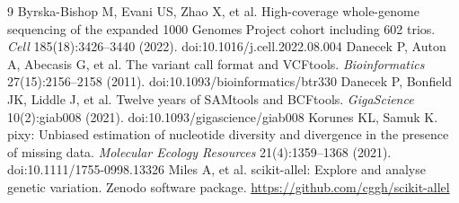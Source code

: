 \documentclass[11pt]{article}
\begin{document}
\begin{thebibliography}{9}
 Byrska-Bishop M, Evani US, Zhao X, et al.
  High-coverage whole-genome sequencing of the expanded 1000 Genomes Project
  cohort including 602 trios. \textit{Cell} 185(18):3426--3440 (2022).
  doi:10.1016/j.cell.2022.08.004
 Danecek P, Auton A, Abecasis G, et al.
  The variant call format and VCFtools. \textit{Bioinformatics}
  27(15):2156--2158 (2011). doi:10.1093/bioinformatics/btr330
 Danecek P, Bonfield JK, Liddle J, et al.
  Twelve years of SAMtools and BCFtools. \textit{GigaScience} 10(2):giab008
  (2021). doi:10.1093/gigascience/giab008
 Korunes KL, Samuk K. pixy: Unbiased estimation of nucleotide
  diversity and divergence in the presence of missing data.
  \textit{Molecular Ecology Resources} 21(4):1359--1368 (2021).
  doi:10.1111/1755-0998.13326
 Miles A, et al. scikit-allel: Explore and analyse genetic
  variation. Zenodo software package.
  \url{https://github.com/cggh/scikit-allel}
\end{thebibliography}
\end{document}
